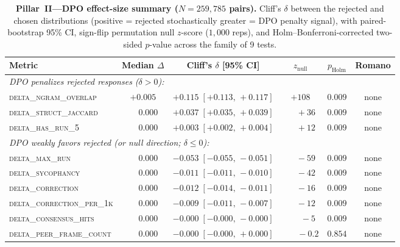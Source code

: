 \documentclass{article}
\begin{document}
\begin{table}[t]
\centering
\small
\caption{\textbf{Pillar~II---DPO effect-size summary ($N{=}259{,}785$ pairs).} Cliff's $\delta$ between the rejected and chosen distributions (positive = rejected stochastically greater = DPO penalty signal), with paired-bootstrap 95\% CI, sign-flip permutation null $z$-score ($1{,}000$ reps), and Holm--Bonferroni-corrected two-sided $p$-value across the family of 9 tests.}
\label{tab:data_audit}
\setlength{\tabcolsep}{4pt}
\begin{tabular}{lccccc}
\toprule
\textbf{Metric} & \textbf{Median $\Delta$} & \textbf{Cliff's $\delta$ [95\% CI]} & \textbf{$z_{\text{null}}$} & \textbf{$p_{\text{Holm}}$} & \textbf{Romano} \\
\midrule
\multicolumn{6}{l}{\emph{DPO penalizes rejected responses ($\delta>0$):}}\\
\textsc{delta\_ngram\_overlap}     & $+0.005$ & $+0.115\;[+0.113,\,+0.117]$ & $+108$ & $0.009$ & none \\
\textsc{delta\_struct\_jaccard}    & $\phantom{+}0.000$ & $+0.037\;[+0.035,\,+0.039]$ & $\phantom{+0}+36$ & $0.009$ & none \\
\textsc{delta\_has\_run\_5}        & $\phantom{+}0.000$ & $+0.003\;[+0.002,\,+0.004]$ & $\phantom{+0}+12$ & $0.009$ & none \\
\midrule
\multicolumn{6}{l}{\emph{DPO weakly favors rejected (or null direction; $\delta\leq 0$):}}\\
\textsc{delta\_max\_run}           & $\phantom{+}0.000$ & $-0.053\;[-0.055,\,-0.051]$ & $\phantom{+0}-59$ & $0.009$ & none \\
\textsc{delta\_sycophancy}         & $\phantom{+}0.000$ & $-0.011\;[-0.011,\,-0.010]$ & $\phantom{+0}-42$ & $0.009$ & none \\
\textsc{delta\_correction}         & $\phantom{+}0.000$ & $-0.012\;[-0.014,\,-0.011]$ & $\phantom{+0}-16$ & $0.009$ & none \\
\textsc{delta\_correction\_per\_1k}& $\phantom{+}0.000$ & $-0.009\;[-0.011,\,-0.007]$ & $\phantom{+0}-12$ & $0.009$ & none \\
\textsc{delta\_consensus\_hits}    & $\phantom{+}0.000$ & $-0.000\;[-0.000,\,-0.000]$ & $\phantom{+00}-5$ & $0.009$ & none \\
\textsc{delta\_peer\_frame\_count} & $\phantom{+}0.000$ & $-0.000\;[-0.000,\,+0.000]$ & $\phantom{+00}-0.2$ & $\mathbf{0.854}$ & none \\
\bottomrule
\end{tabular}
\end{table}
\end{document}
